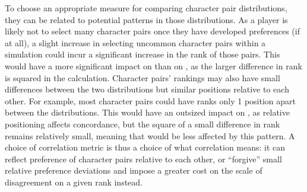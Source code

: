 To choose an appropriate measure for comparing character pair distributions,
they can be related to potential patterns in those distributions. As a player is
likely not to select many character pairs once they have developed preferences
(if at all), a slight increase in selecting uncommon character pairs within a
simulation could incur a significant increase in the rank of those pairs. This
would have a more significant impact on \rho{} than on \tau{}, as the larger
difference in rank is squared in the calculation. Character pairs' rankings may
also have small differences between the two distributions but similar positions
relative to each other. For example, most character pairs could have ranks only
1 position apart between the distributions. This would have an outsized impact
on \tau{}, as relative positioning affects concordance, but the square of a
small difference in rank remains relatively small, meaning that \rho{} would be
less affected by this pattern. A choice of correlation metric is thus a choice
of what correlation means: it can reflect preference of character pairs relative
to each other, or ``forgive'' small relative preference deviations and impose a
greater cost on the scale of disagreement on a given rank instead.



